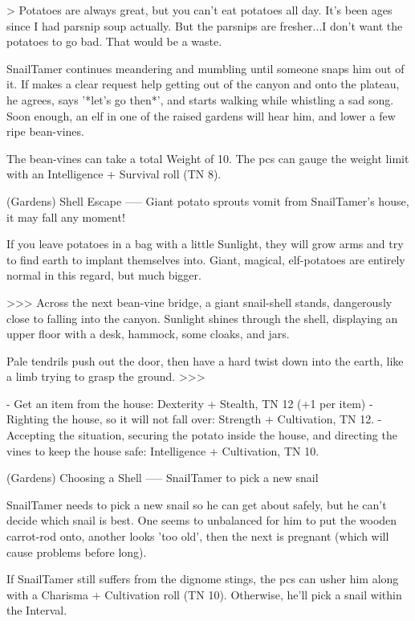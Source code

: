 > Potatoes are always great, but you can't eat potatoes all day.  It's been ages since I had parsnip soup actually.  But the parsnips are fresher...I don't want the potatoes to go bad.  That would be a waste.

SnailTamer continues meandering and mumbling until someone snaps him out of it.
If  makes a clear request help getting out of the canyon and onto the plateau, he agrees, says '*let's go then*', and starts walking while whistling a sad song.
Soon enough, an elf in one of the raised gardens will hear him, and lower a few ripe bean-vines.

The bean-vines can take a total Weight of 10.
The \glspl{pc} can gauge the weight limit with an Intelligence + Survival roll (TN 8).

(Gardens) Shell Escape
-----
{Giant potato sprouts vomit from SnailTamer's house, it may fall any moment!}

If you leave potatoes in a bag with a little Sunlight, they will grow arms and try to find earth to implant themselves into.
Giant, magical, elf-potatoes are entirely normal in this regard, but much bigger.

>>>
Across the next bean-vine bridge, a giant snail-shell stands, dangerously close to falling into the canyon.
Sunlight shines through the shell, displaying an upper floor with a desk, hammock, some cloaks, and jars.

Pale tendrils push out the door, then have a hard twist down into the earth, like a limb trying to grasp the ground.
>>>

- Get an item from the house: Dexterity + Stealth, TN 12 (+1 per item)
- Righting the house, so it will not fall over: Strength + Cultivation, TN 12.
- Accepting the situation, securing the potato inside the house, and directing the vines to keep the house safe: Intelligence + Cultivation, TN 10.


(Gardens) Choosing a Shell
-----
{SnailTamer to pick a new snail}

SnailTamer needs to pick a new snail so he can get about safely, but he can't decide which snail is best.
One seems to unbalanced for him to put the wooden carrot-rod onto, another looks 'too old', then the next is pregnant (which will cause problems before long).

If SnailTamer still suffers from the dignome stings,
the \glspl{pc} can usher him along with a Charisma + Cultivation roll (TN 10).
Otherwise, he'll pick a snail within the Interval.

